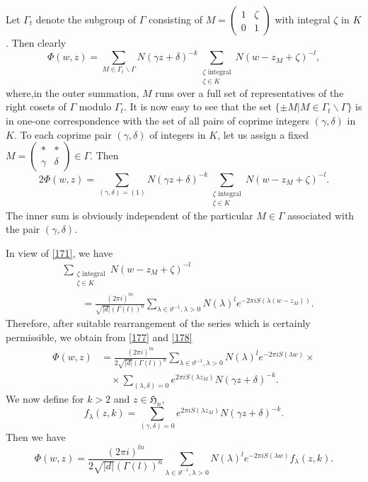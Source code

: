 Let $\Gamma_{t}$ denote the subgroup of $\Gamma$ consisting of
$M=\left(\begin{smallmatrix} 1 & \zeta\\ 0 & 1
\end{smallmatrix}\right)$ with integral $\zeta$ in $K$. Then clearly
\begin{equation*}
\Phi(w,z)=\sum_{M\in\Gamma_{t}\backslash\Gamma}N(\gamma
z+\delta)^{-k}\sum_{\substack{\zeta\text{ integral}\\ \zeta\in
    K}}N(w-z_{M}+\zeta)^{-l},\tag{177}\label{177}
\end{equation*}
where,\pageoriginale in the outer summation, $M$ runs over a full set
of representatives of the right cosets of $\Gamma$ modulo
$\Gamma_{t}$. It is now easy to see that the set $\{\pm
M|M\in\Gamma_{t}\backslash \Gamma\}$ is in one-one correspondence with
the set of all pairs of coprime integers $(\gamma,\delta)$ in $K$. To
each coprime pair $(\gamma,\delta)$ of integers in $K$, let us assign
a fixed $M=\left(\begin{smallmatrix} \ast & \ast\\ \gamma & \delta
\end{smallmatrix}\right)\in\Gamma$. Then
$$
2\Phi(w,z)=\sum_{(\gamma,\delta)=(1)}N(\gamma
z+\delta)^{-k}\sum_{\substack{\zeta\text{ integral}\\ \zeta\in
    K}}N(w-z_{M}+\zeta)^{-l}. 
$$
The inner sum is obviously independent of the particular $M\in\Gamma$
associated with the pair $(\gamma,\delta)$.

In view of \eqref{171}, we have
\begin{equation*}
\begin{split}
&\sum_{\substack{\zeta\text{ integral}\\ \zeta\in
    K}}N(w-z_{M}+\zeta)^{-l}\\
&\qquad =\frac{(2\pi
    i)^{ln}}{\sqrt{|d|}(\Gamma(l))^{n}}\sum_{\lambda\in
    \vartheta^{-1},\lambda>0}N(\lambda)^{l}e^{-2\pi
    iS(\lambda(w-z_{M}))}.
\end{split}
\tag{178}\label{178}
\end{equation*}
Therefore, after suitable rearrangement of the series which is
certainly permissible, we obtain from \eqref{177} and \eqref{178}
\begin{align*}
\Phi(w,z) &= \frac{(2\pi
  i)^{ln}}{2\sqrt{|d|}(\Gamma(l))^{n}}\sum_{\lambda\in
  \vartheta^{-1},\lambda>0}N(\lambda)^{l}e^{-2\pi iS(\lambda
  w)}\times\\
&\quad \times \sum_{(\lambda,\delta)=0}e^{2\pi iS(\lambda
  z_{M})}N(\gamma z+\delta)^{-k}.
\end{align*}
We now define for $k>2$ and $z\in\mathfrak{H}_{n}$,
\begin{equation*}
f_{\lambda}(z,k)=\sum_{(\gamma,\delta)=0}e^{2\pi iS(\lambda
  z_{M})}N(\gamma z+\delta)^{-k}.\tag{179}\label{179}
\end{equation*}
Then we have
$$
\Phi(w,z)=\frac{(2\pi
  i)^{ln}}{2\sqrt{|d|}(\Gamma(l))^{n}}\sum_{\lambda\in\vartheta^{-1},\lambda>0}N(\lambda)^{l}e^{-2\pi
  iS(\lambda w)}f_{\lambda}(z,k).
$$

